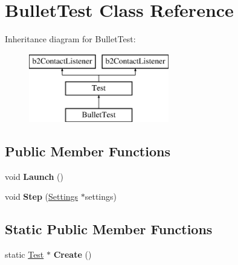 \hypertarget{class_bullet_test}{\section{Bullet\-Test Class Reference}
\label{class_bullet_test}
}
Inheritance diagram for Bullet\-Test\-:\begin{figure}[H]
\begin{center}
\leavevmode
\includegraphics[height=3.000000cm]{class_bullet_test}
\end{center}
\end{figure}
\subsection*{Public Member Functions}
\begin{DoxyCompactItemize}
\item 
\hypertarget{class_bullet_test_a029f92fc1a17e65ed54b59cb09d61818}{void {\bfseries Launch} ()}\label{class_bullet_test_a029f92fc1a17e65ed54b59cb09d61818}

\item 
\hypertarget{class_bullet_test_aacd5bcd0c3be4c7cc93fba1f8d7c22b2}{void {\bfseries Step} (\hyperlink{struct_settings}{Settings} $\ast$settings)}\label{class_bullet_test_aacd5bcd0c3be4c7cc93fba1f8d7c22b2}

\end{DoxyCompactItemize}
\subsection*{Static Public Member Functions}
\begin{DoxyCompactItemize}
\item 
\hypertarget{class_bullet_test_acbb6035e95ab43717991d737aff9791e}{static \hyperlink{class_test}{Test} $\ast$ {\bfseries Create} ()}\label{class_bullet_test_acbb6035e95ab43717991d737aff9791e}

\end{DoxyCompactItemize}
